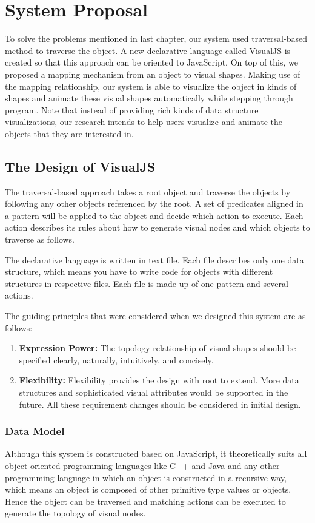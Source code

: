 \chapter {System Proposal}
\label {System Proposal}

To solve the problems mentioned in last chapter, our system used traversal-based method \cite{729554} to traverse the object. A new declarative language called VisualJS is created so that this approach can be oriented to JavaScript. On top of this, we proposed a mapping mechanism from an object to visual shapes. Making use of the mapping relationship, our system is able to visualize the object in kinds of shapes and animate these visual shapes automatically while stepping through program. Note that instead of providing rich kinds of data structure visualizations, our research intends to help users visualize and animate the objects that they are interested in.

\section {The Design of VisualJS}
The traversal-based approach takes a root object and traverse the objects by following any other objects referenced by the root. A set of predicates aligned in a pattern will be applied to the object and decide which action to execute. Each action describes its rules about how to generate visual nodes and which objects to traverse as follows.

The declarative language is written in text file. Each file describes only one data structure, which means you have to write code for objects with different structures in respective files. Each file is made up of one pattern and several actions.

The guiding principles that were considered when we designed this system are as follows:
\begin {enumerate}
\item \textbf {Expression Power:} The topology relationship of visual shapes should be specified clearly, naturally, intuitively, and concisely.
\item \textbf {Flexibility:} Flexibility provides the design with root to extend. More data structures and sophisticated visual attributes would be supported in the future. All these requirement changes should be considered in initial design. 
\end {enumerate}

\subsection {Data Model}
Although this system is constructed based on JavaScript, it theoretically suits all object-oriented programming languages like C++ and Java and any other programming language in which an object is constructed in a recursive way, which means an object is composed of other primitive type values or objects. Hence the object can be traversed and matching actions can be executed to generate the topology of visual nodes.

